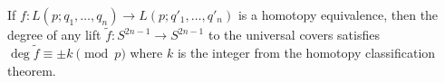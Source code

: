 If $f: L(p; q_1, \ldots, q_n) \rightarrow L(p; q'_1, \ldots, q'_n)$ is a homotopy equivalence, then the degree of any lift $\tilde{f}: S^{2n-1} \rightarrow S^{2n-1}$ to the universal covers satisfies $\deg \tilde{f} \equiv \pm k \pmod{p}$ where $k$ is the integer from the homotopy classification theorem.
